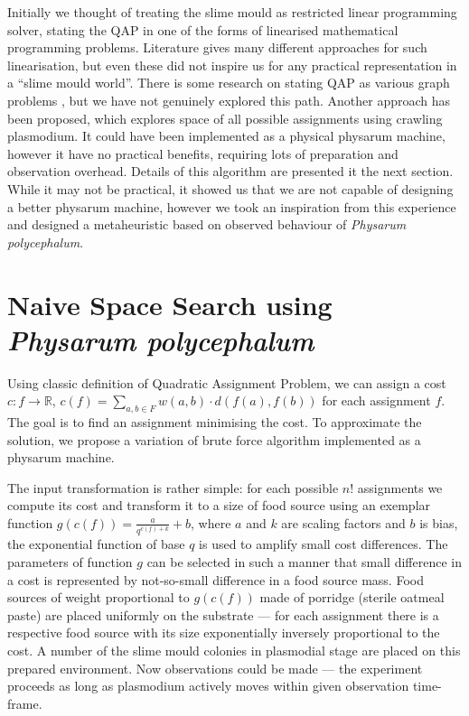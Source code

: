 \documentclass[english,a4paper,twoside]{ppfcmthesis}
\begin{document}
Initially we thought of treating the slime mould as restricted linear programming solver, stating the QAP in one of the forms of linearised mathematical programming problems. Literature gives many different approaches for such linearisation, but even these did not inspire us for any practical representation in a ``slime mould world''. There is some research on stating QAP as various graph problems \cite{cela2013quadratic}, but we have not genuinely explored this path. Another approach has been proposed, which explores space of all possible assignments using crawling plasmodium. It could have been implemented as a physical physarum machine, however it have no practical benefits, requiring lots of preparation and observation overhead. Details of this algorithm are presented it the next section. While it may not be practical, it showed us that we are not capable of designing a better physarum machine, however we took an inspiration from this experience and designed a metaheuristic based on observed behaviour of \textit{Physarum polycephalum}.

\section{Naive Space Search using \textit{Physarum polycephalum}}
\label{section:algorithm_naive}

Using classic definition of Quadratic Assignment Problem, we can assign a cost $c : f \rightarrow \mathbb{R}$, $c(f) = \sum_{a,b\in F}w(a,b)\cdot d(f(a), f(b))$ for each assignment $f$. The goal is to find an assignment minimising the cost. To approximate the solution, we propose a variation of brute force algorithm implemented as a physarum machine.

The input transformation is rather simple: for each possible $n!$ assignments we compute its cost and transform it to a size of food source using an exemplar function $g(c(f)) = \frac{a}{q^{c(f)+k}}+b$, where $a$ and $k$ are scaling factors and $b$ is bias, the exponential function of base $q$ is used to amplify small cost differences. The parameters of function $g$ can be selected in such a manner that small difference in a cost is represented by not-so-small difference in a food source mass. Food sources of weight proportional to $g(c(f))$ made of porridge (sterile oatmeal paste) are placed uniformly on the substrate --- for each assignment there is a respective food source with its size exponentially inversely proportional to the cost. A number of the slime mould colonies in plasmodial stage are placed on this prepared environment. Now observations could be made --- the experiment proceeds as long as plasmodium actively moves within given observation time-frame. 
\end{document}

